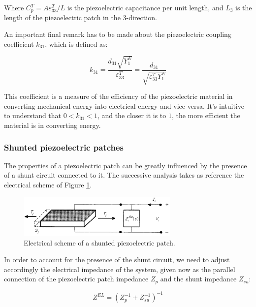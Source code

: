 Where $C_p^T = A \varepsilon_{33}^T / L$ is the piezoelectric capacitance per unit length, and $L_3$ is the length of the piezoelectric patch in the $3$-direction.

An important final remark has to be made about the piezoelectric coupling coefficient $k_{31}$, which is defined as:

\begin{equation}
    k_{31} = \frac{d_{31} \sqrt{Y_1^E}}{\varepsilon_{33}^T} = \frac{d_{31}}{\sqrt{\varepsilon_{33}^T Y_1^E}}
\end{equation}

This coefficient is a measure of the efficiency of the piezoelectric material in converting mechanical energy into electrical energy and vice versa.
It's intuitive to understand that $0 < k_{31} < 1$, and the closer it is to $1$, the more efficient the material is in converting energy.


\subsubsection{Shunted piezoelectric patches}
\label{subsubsec:shunted_piezoelectric_patches}

The properties of a piezoelectric patch can be greatly influenced by the presence of a shunt circuit connected to it.
The successive analysis takes as reference the electrical scheme of Figure \ref{fig:shunted_piezoelectric_patch}.

\begin{figure}[H]
    \centering
    \includegraphics[width=0.7\textwidth]{img/piezo_shunted.png}
    \caption{Electrical scheme of a shunted piezoelectric patch.}
    \label{fig:shunted_piezoelectric_patch}
\end{figure}

In order to account for the presence of the shunt circuit, we need to adjust accordingly the electrical impedance of the system, given now as the parallel connection of the piezoelectric patch impedance $Z_p$ and the shunt impedance $Z_{su}$:

\begin{equation}
    Z^{EL} = \left( Z_p^{-1} + Z_{su}^{-1} \right)^{-1}
\end{equation}

